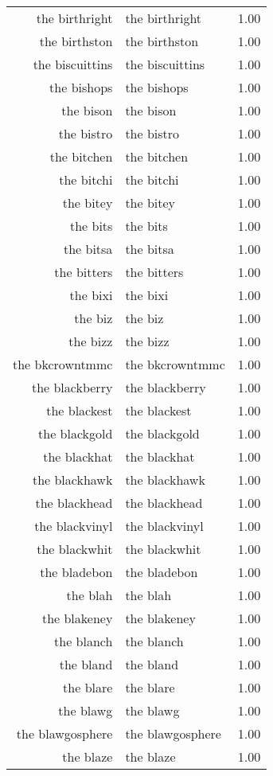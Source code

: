 \begin{table}[ht]
\begin{tabular}{rlr}
  the birthright & the birthright & 1.00 \\ 
  the birthston & the birthston & 1.00 \\ 
  the biscuittins & the biscuittins & 1.00 \\ 
  the bishops & the bishops & 1.00 \\ 
  the bison & the bison & 1.00 \\ 
  the bistro & the bistro & 1.00 \\ 
  the bitchen & the bitchen & 1.00 \\ 
  the bitchi & the bitchi & 1.00 \\ 
  the bitey & the bitey & 1.00 \\ 
  the bits & the bits & 1.00 \\ 
  the bitsa & the bitsa & 1.00 \\ 
  the bitters & the bitters & 1.00 \\ 
  the bixi & the bixi & 1.00 \\ 
  the biz & the biz & 1.00 \\ 
  the bizz & the bizz & 1.00 \\ 
  the bkcrowntmmc & the bkcrowntmmc & 1.00 \\ 
  the blackberry & the blackberry & 1.00 \\ 
  the blackest & the blackest & 1.00 \\ 
  the blackgold & the blackgold & 1.00 \\ 
  the blackhat & the blackhat & 1.00 \\ 
  the blackhawk & the blackhawk & 1.00 \\ 
  the blackhead & the blackhead & 1.00 \\ 
  the blackvinyl & the blackvinyl & 1.00 \\ 
  the blackwhit & the blackwhit & 1.00 \\ 
  the bladebon & the bladebon & 1.00 \\ 
  the blah & the blah & 1.00 \\ 
  the blakeney & the blakeney & 1.00 \\ 
  the blanch & the blanch & 1.00 \\ 
  the bland & the bland & 1.00 \\ 
  the blare & the blare & 1.00 \\ 
  the blawg & the blawg & 1.00 \\ 
  the blawgosphere & the blawgosphere & 1.00 \\ 
  the blaze & the blaze & 1.00 \\ 

\end{tabular}
\end{table}
